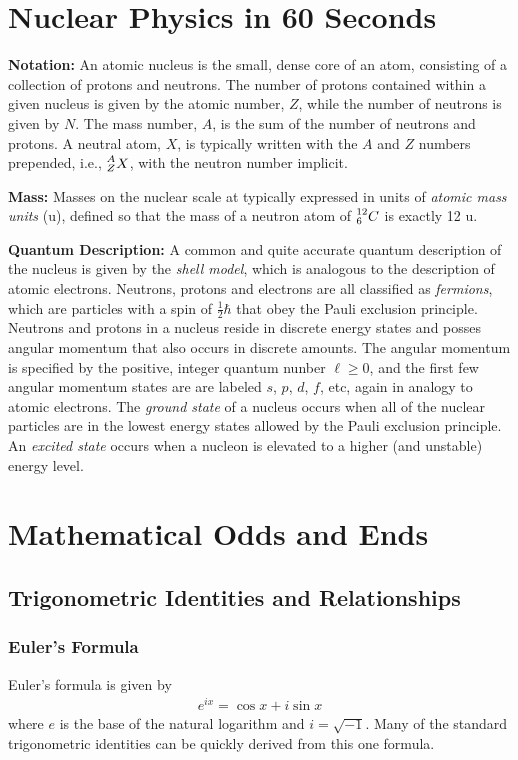 \documentclass[11pt]{article}
\newcommand\leftidx[3]{{\vphantom{#2}}#1#2#3}
\begin{document}
\section{Nuclear Physics in 60 Seconds}
\label{sec:orgheadline58}
\textbf{Notation:} An atomic nucleus is the small, dense core of an atom, consisting of a collection of protons and neutrons.  The number of protons contained within a given nucleus is given by the atomic number, \(Z\), while the number of neutrons is given by \(N\).  The mass number, \(A\), is the sum of the number of neutrons and protons.  A neutral atom, \(X\), is typically written with the \(A\) and \(Z\) numbers prepended, i.e., \(\leftidx{^A_Z}{X}{}\), with the neutron number implicit.

\textbf{Mass:} Masses on the nuclear scale at typically expressed in units of \emph{atomic mass units} (u), defined so that the mass of a neutron atom of \(\leftidx{^{12}_6}{C}{}\) is exactly 12 u.

\textbf{Quantum Description:}  A common and quite accurate quantum description of the nucleus is given by the \emph{shell model}, which is analogous to the description of atomic electrons.  Neutrons, protons and electrons are all classified as \emph{fermions}, which are particles with a spin of \(\frac{1}{2}\hbar\) that obey the Pauli exclusion principle.  Neutrons and protons in a nucleus reside in discrete energy states and posses angular momentum that also occurs in discrete amounts.  The angular momentum is specified by the positive, integer quantum nunber \(\ell \geq 0\), and the first few angular momentum states are are labeled \(s\), \(p\), \(d\), \(f\), etc, again in analogy to atomic electrons.  The \emph{ground state} of a nucleus occurs when all of the nuclear particles are in the lowest energy states allowed by the Pauli exclusion principle.  An \emph{excited state} occurs when a nucleon is elevated to a higher (and unstable) energy level.

\section{Mathematical Odds and Ends}
\label{sec:orgheadline70}
\subsection{Trigonometric Identities and Relationships}
\label{sec:orgheadline62}
\subsubsection{Euler's Formula}
\label{sec:orgheadline59}
Euler's formula is given by
\begin{align}
  e^{i x} = \cos x + i \sin x
\end{align}
where \(e\) is the base of the natural logarithm and \(i = \sqrt{-1}\).  Many of the standard trigonometric identities can be quickly derived from this one formula.
\end{document}
